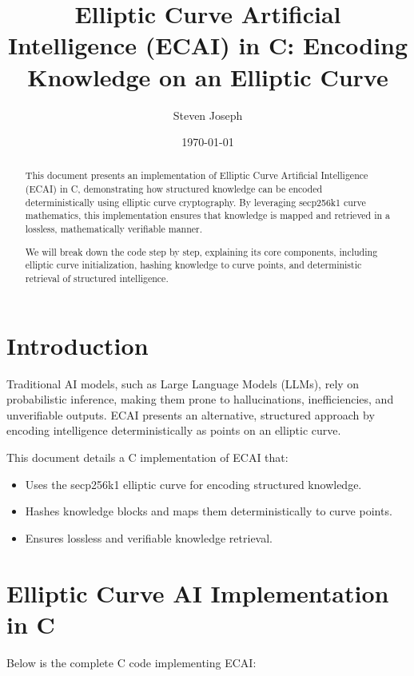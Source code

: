 \documentclass{article}
\title{Elliptic Curve Artificial Intelligence (ECAI) in C: Encoding Knowledge on an Elliptic Curve}
\author{Steven Joseph}
\date{\today}
\begin{document}
\maketitle

\begin{abstract}
This document presents an implementation of Elliptic Curve Artificial Intelligence (ECAI) in C, demonstrating how structured knowledge can be encoded deterministically using elliptic curve cryptography. By leveraging secp256k1 curve mathematics, this implementation ensures that knowledge is mapped and retrieved in a lossless, mathematically verifiable manner.

We will break down the code step by step, explaining its core components, including elliptic curve initialization, hashing knowledge to curve points, and deterministic retrieval of structured intelligence.
\end{abstract}

\section{Introduction}
Traditional AI models, such as Large Language Models (LLMs), rely on probabilistic inference, making them prone to hallucinations, inefficiencies, and unverifiable outputs. ECAI presents an alternative, structured approach by encoding intelligence deterministically as points on an elliptic curve.

This document details a C implementation of ECAI that:
\begin{itemize}
    \item Uses the secp256k1 elliptic curve for encoding structured knowledge.
    \item Hashes knowledge blocks and maps them deterministically to curve points.
    \item Ensures lossless and verifiable knowledge retrieval.
\end{itemize}

\section{Elliptic Curve AI Implementation in C}
Below is the complete C code implementing ECAI:
\end{document}
